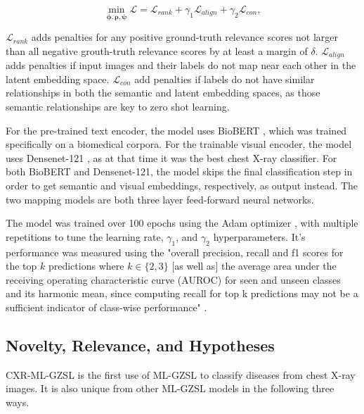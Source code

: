 \documentclass[letterpaper]{article} %
\begin{document}
\begin{equation}
    \min_{\boldsymbol{\phi} ,\boldsymbol{\rho} ,\boldsymbol{\psi}} \mathcal{L} = \mathcal{L}_{{rank}} +\gamma_{1} \mathcal{L}_{align} +\gamma_{2} \mathcal{L}_{con},
    \label{eqn:full_loss}
\end{equation}

\texorpdfstring{$\mathcal{L}_{rank}$}: adds penalties for any positive ground-truth relevance scores not larger than all negative grouth-truth relevance scores by at least a margin of $\delta$. \texorpdfstring{$\mathcal{L}_{align}$}: adds penalties if input images and their labels do not map near each other in the latent embedding space. \texorpdfstring{$\mathcal{L}_{con}$}: add penalties if labels do not have similar relationships in both the semantic and latent embedding spaces, as those semantic relationships are key to zero shot learning. 

For the pre-trained text encoder, the model uses BioBERT \cite{10.1093/bioinformatics/btz682}, which was trained specifically on a biomedical corpora. For the trainable visual encoder, the model uses Densenet-121 \cite{rajpurkar2017chexnetradiologistlevelpneumoniadetection}, as at that time it was the best chest X-ray classifier. For both BioBERT and Densenet-121, the model skips the final classification step in order to get semantic and visual embeddings, respectively, as output instead. The two mapping models are both three layer feed-forward neural networks.

The model was trained over 100 epochs using the Adam optimizer \cite{kingma2017adammethodstochasticoptimization}, with multiple repetitions to tune the learning rate, $\gamma_1$, and $\gamma_2$ hyperparameters. It's performance was measured using the "overall precision, recall and f1 scores for the top $k$ predictions where $k \in \{2, 3 \}$ [as well as] the average area under the receiving operating characteristic curve (AUROC) for seen and unseen classes and its harmonic mean, since computing recall for top k predictions may not be a sufficient indicator of class-wise performance" \cite{hayat2021multilabel}.

\subsection{Novelty, Relevance, and Hypotheses}

CXR-ML-GZSL is the first use of ML-GZSL to classify diseases from chest X-ray images. It is also unique from other ML-GZSL models in the following three ways.
\end{document}
